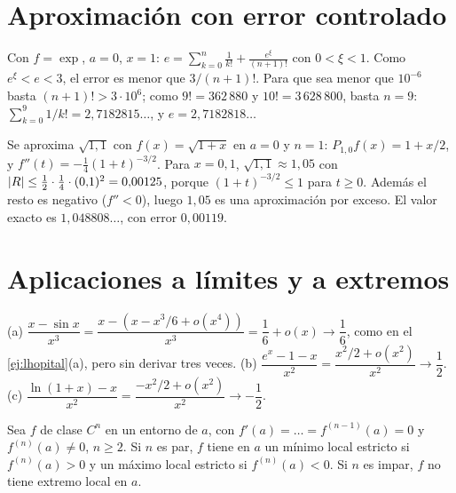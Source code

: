 \section{Aproximación con error controlado}

\begin{ejemplo}[Cálculo de $e$]\label{ej:calculo-e}
Con $f=\exp$, $a=0$, $x=1$: $e=\sum_{k=0}^{n}\frac{1}{k!}+\frac{e^{\xi}}{(n+1)!}$ con $0<\xi<1$. Como $e^{\xi}<e<3$, el error es menor que $3/(n+1)!$. Para que sea menor que $10^{-6}$ basta $(n+1)!>3\cdot10^{6}$; como $9!=362\,880$ y $10!=3\,628\,800$, basta $n=9$: $\sum_{k=0}^{9}1/k!=2{,}7182815\dots$, y $e=2{,}7182818\dots$
\end{ejemplo}

\begin{ejemplo}\label{ej:raiz}
Se aproxima $\sqrt{1{,}1}$ con $f(x)=\sqrt{1+x}$ en $a=0$ y $n=1$: $P_{1,0}f(x)=1+x/2$, y $f''(t)=-\tfrac14(1+t)^{-3/2}$. Para $x=0{,}1$, $\sqrt{1{,}1}\approx1{,}05$ con $\lvert R\rvert\le\frac{1}{2}\cdot\frac14\cdot(0{,}1)^{2}=0{,}00125$, porque $(1+t)^{-3/2}\le1$ para $t\ge0$. Además el resto es negativo ($f''<0$), luego $1{,}05$ es una aproximación por exceso. El valor exacto es $1{,}048808\dots$, con error $0{,}00119$.
\end{ejemplo}

\section{Aplicaciones a límites y a extremos}

\begin{ejemplo}\label{ej:limites-taylor}
(a) $\dfrac{x-\sin x}{x^{3}}=\dfrac{x-(x-x^{3}/6+o(x^{4}))}{x^{3}}=\dfrac16+o(x)\to\dfrac16$, como en el \cref{ej:lhopital}(a), pero sin derivar tres veces.
(b) $\dfrac{e^{x}-1-x}{x^{2}}=\dfrac{x^{2}/2+o(x^{2})}{x^{2}}\to\dfrac12$.
(c) $\dfrac{\ln(1+x)-x}{x^{2}}=\dfrac{-x^{2}/2+o(x^{2})}{x^{2}}\to-\dfrac12$.
\end{ejemplo}

\begin{proposicion}\label{prop:criterio-n}
Sea $f$ de clase $C^{n}$ en un entorno de $a$, con $f'(a)=\dots=f^{(n-1)}(a)=0$ y $f^{(n)}(a)\ne0$, $n\ge2$. Si $n$ es par, $f$ tiene en $a$ un mínimo local estricto si $f^{(n)}(a)>0$ y un máximo local estricto si $f^{(n)}(a)<0$. Si $n$ es impar, $f$ no tiene extremo local en $a$.
\end{proposicion}

